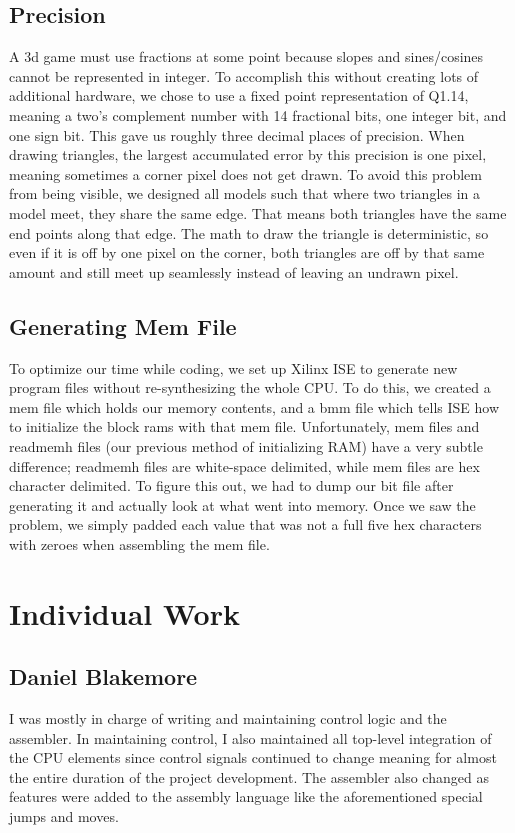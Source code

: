 \documentclass[onecolumn]{IEEEtran}
\begin{document}
\subsection{Precision}
A 3d game must use fractions at some point because slopes and sines/cosines cannot be represented in integer.  To accomplish this without creating lots of additional hardware, we chose to use a fixed point representation of Q1.14, meaning a two's complement number with 14 fractional bits, one integer bit, and one sign bit.  This gave us roughly three decimal places of precision.  When drawing triangles, the largest accumulated error by this precision is one pixel, meaning sometimes a corner pixel does not get drawn.  To avoid this problem from being visible, we designed all models such that where two triangles in a model meet, they share the same edge.  That means both triangles have the same end points along that edge.  The math to draw the triangle is deterministic, so even if it is off by one pixel on the corner, both triangles are off by that same amount and still meet up seamlessly instead of leaving an undrawn pixel.

\subsection{Generating Mem File}
To optimize our time while coding, we set up Xilinx ISE to generate new program files without re-synthesizing the whole CPU.  To do this, we created a mem file which holds our memory contents, and a bmm file which tells ISE how to initialize the block rams with that mem file.  Unfortunately, mem files and readmemh files (our previous method of initializing RAM) have a very subtle difference; readmemh files are white-space delimited, while mem files are hex character delimited.  To figure this out, we had to dump our bit file after generating it and actually look at what went into memory.  Once we saw the problem, we simply padded each value that was not a full five hex characters with zeroes when assembling the mem file.



\section{Individual Work}
\subsection{Daniel Blakemore}
I was mostly in charge of writing and maintaining control logic and the assembler.  In maintaining control, I also maintained all top-level integration of the CPU elements since control signals continued to change meaning for almost the entire duration of the project development.  The assembler also changed as features were added to the assembly language like the aforementioned special jumps and moves.
\end{document}
